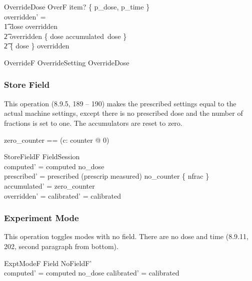 \begin{schema}{OverrideDose}
	OverF
\where
	item? \in \{ p\_dose, p\_time \} \\
overridden' = \\
\t1 \IF dose \notin \dom overridden \\
\t2	\THEN overridden \oplus \{ dose \mapsto accumulated~dose \} \\
\t2	\ELSE \{ dose \} \ndres overridden
\end{schema}

\begin{zed} OverrideF  OverrideSetting \lor OverrideDose \end{zed}

\subsubsection{Store Field}

This operation (8.9.5, 189 -- 190) makes the prescribed settings equal
to the actual machine settings, except there is no prescribed dose and
the number of fractions is set to one.  The accumulators are reset to
zero.

\begin{zed}
	zero\_counter == (\lambda c: counter @ 0)
\end{zed}

\begin{schema}{StoreFieldF}
	\Delta FieldSession \\
\where
	computed' = computed \oplus no\_dose \\
	prescribed' = prescribed \oplus  (prescrip \dres measured) 
			\oplus no\_counter \oplus \{ nfrac  \} \\
	accumulated' = zero\_counter \\
	overridden' = \emptyset
\also
	calibrated' = calibrated \\
\end{schema}


\subsubsection{Experiment Mode}

This operation toggles modes with no field.  There are
no dose and time (8.9.11, 202, second paragraph from bottom).

\begin{schema}{ExptModeF}
	\Delta Field
\where
	NoFieldF' \\
	computed' = computed \oplus no\_dose
\also
	calibrated' = calibrated
\end{schema}

